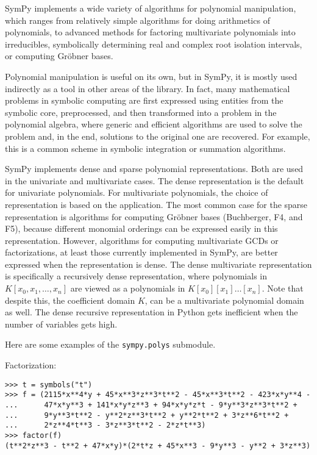 
SymPy implements a wide variety of algorithms for polynomial manipulation,
which ranges from relatively simple algorithms for doing arithmetics of
polynomials, to advanced methods for factoring multivariate polynomials
into irreducibles, symbolically determining real and complex root isolation
intervals, or computing Gr\"{o}bner bases.

Polynomial manipulation is useful on its own, but in SymPy, it is mostly used
indirectly as a tool in other areas of the library. In fact, many mathematical
problems in symbolic computing are first expressed using entities from the
symbolic core, preprocessed, and then transformed into a problem in the
polynomial algebra, where generic and efficient algorithms are used to solve
the problem and, in the end, solutions to the original one are recovered. For
example, this is a common scheme in symbolic integration or summation
algorithms.

SymPy implements dense and sparse polynomial representations. Both are used in
the univariate and multivariate cases. The dense representation is the default
for univariate polynomials. For multivariate polynomials, the choice of
representation is based on the application. The most common case for the sparse
representation is algorithms for computing Gr\"{o}bner bases (Buchberger, F4,
and F5),
because different monomial orderings can be expressed easily in this
representation. However, algorithms for computing multivariate GCDs or
factorizations, at least those currently implemented in SymPy,
are better expressed when the representation is dense. The dense multivariate
representation is specifically a recursively dense representation, where
polynomials in $K[x_0, x_1,\dots, x_n]$ are viewed as a polynomials in
$K[x_0][x_1]\ldots[x_n]$. Note that despite this, the coefficient domain $K$,
can be a multivariate polynomial domain as well. The dense recursive
representation in Python gets inefficient when the number of variables gets
high.

Here are some examples of the \texttt{sympy.polys} submodule.

\noindent Factorization:
\begin{verbatim}
>>> t = symbols("t")
>>> f = (2115*x**4*y + 45*x**3*z**3*t**2 - 45*x**3*t**2 - 423*x*y**4 -
...      47*x*y**3 + 141*x*y*z**3 + 94*x*y*z*t - 9*y**3*z**3*t**2 +
...      9*y**3*t**2 - y**2*z**3*t**2 + y**2*t**2 + 3*z**6*t**2 +
...      2*z**4*t**3 - 3*z**3*t**2 - 2*z*t**3)
>>> factor(f)
(t**2*z**3 - t**2 + 47*x*y)*(2*t*z + 45*x**3 - 9*y**3 - y**2 + 3*z**3)
\end{verbatim}

